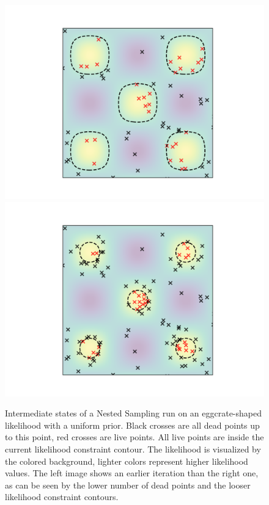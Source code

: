 \documentclass[12pt, a4paper]{report}
\begin{document}
\begin{figure}
    \centering
    \includegraphics[trim={3cm 1cm 2.4cm 1cm}, clip, scale=0.65]{figs/ns_eggcrate_example_1.png}
    \includegraphics[trim={2.4cm 1cm 3cm 1cm}, clip, scale=0.65]{figs/ns_eggcrate_example_2.png}
    \caption{Intermediate states of a Nested Sampling run on an eggcrate-shaped likelihood with a uniform prior. Black crosses are all dead points up to this point, red crosses are live points. All live points are inside the current likelihood constraint contour. The likelihood is visualized by the colored background, lighter colors represent higher likelihood values. The left image shows an earlier iteration than the right one, as can be seen by the lower number of dead points and the looser likelihood constraint contours.}
    \label{fig:ns_eggcrate_example}
\end{figure}
\end{document}
